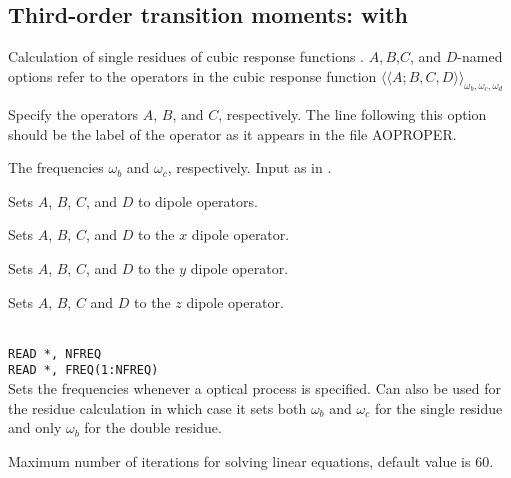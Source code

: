 \subsection{Third-order transition moments:  with }
Calculation of single residues of
cubic response functions
\cite{pndjovhacpl242,djpnhajcp105,pndjhapdkrthhkcpl253}.
$A,B$,$C$, and $D$-named options refer to the operators in the cubic
response function
$\langle\!\langle A;B,C,D \rangle\!\rangle_{\omega_b,\omega_c,\omega_d}$

\begin{description}

\item[, , ]
Specify the operators $A$, $B$, and $C$, respectively.
The line following this
option should be the label of the operator as it appears in the file
AOPROPER.

\item[, ]
The frequencies
$\omega_b$ and $\omega_c$, respectively. Input as in
.

\item{}
Sets $A$, $B$, $C$, and $D$ to dipole operators.

\item{}
Sets $A$, $B$, $C$, and $D$ to the $x$ dipole operator.

\item{}
Sets $A$, $B$, $C$, and $D$ to the $y$ dipole operator.

\item{}
Sets $A$, $B$, $C$ and $D$ to the $z$ dipole operator.

\item{}\\
\verb|READ *, NFREQ|\\
\verb|READ *, FREQ(1:NFREQ)|\\
Sets the frequencies whenever a optical process is specified.
Can also be used for the residue calculation in which case it sets
both $\omega_b$ and $\omega_c$ for the single residue and only
$\omega_b$ for the double residue.

\item{}
Maximum number of iterations for solving linear equations, default value is 60.


\end{description}
